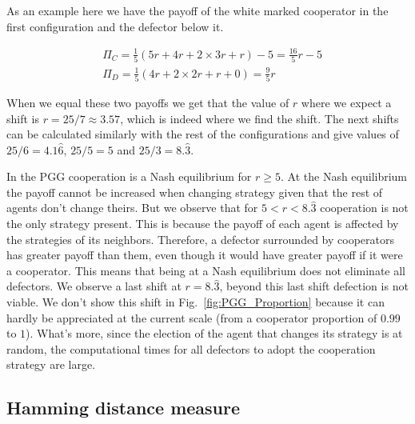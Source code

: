 As an example here we have the payoff of the white marked cooperator in the first configuration and the defector below it.

\begin{equation}
    \begin{split}
    	&\Pi_C=\frac{1}{5}(5r+4r+2\times3r+r)-5=\frac{16}{5}r-5 \\
    	&\Pi_D=\frac{1}{5}(4r+2\times2r+r+0)=\frac{9}{5}r
    \end{split}
\end{equation}

When we equal these two payoffs we get that the value of $r$ where we expect a shift is $r=25/7\approx3.57$, which is indeed where we find the shift. The next shifts can be calculated similarly with the rest of the configurations and give values of $25/6=4.1\hat6$, $25/5=5$ and $25/3=8.\hat3$.


In the PGG cooperation is a Nash equilibrium for $r\geq5$. At the Nash equilibrium  the payoff cannot be increased when changing strategy given that the rest of agents don't change theirs. But we observe that for $5<r<8.\hat3$ cooperation is not the only strategy present. This is because the payoff of each agent is affected by the strategies of its neighbors. Therefore, a defector surrounded by cooperators has greater payoff than them, even though it would have greater payoff if it were a cooperator. This means that being at a Nash equilibrium does not eliminate all defectors. We observe a last shift at $r=8.\hat3$, beyond this last shift defection is not viable.  We don't show this shift in Fig.~\ref{fig:PGG_Proportion} because it can hardly be appreciated at the current scale (from a cooperator proportion of $0.99$ to $1$). What's more, since the election of the agent that changes its strategy is at random, the computational times for all defectors to adopt the cooperation strategy are large.





\subsection{Hamming distance measure}




